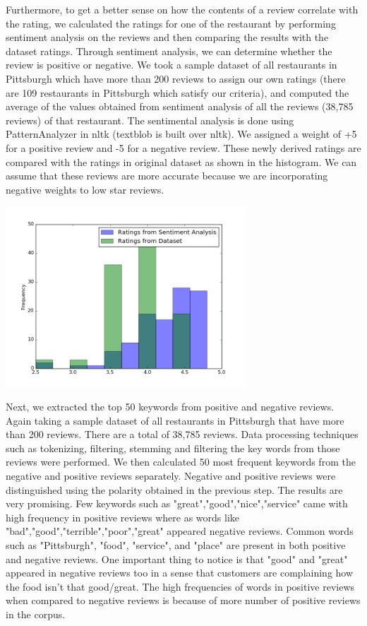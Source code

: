 \documentclass{neu_handout}
\begin{document}
Furthermore, to get a better sense on how the contents of a review correlate with the rating, we calculated the ratings for one of the restaurant by performing sentiment analysis on the reviews and then comparing the results with the dataset ratings. Through sentiment analysis, we can determine whether the review is positive or negative. We took a sample dataset of all restaurants in Pittsburgh which have more than 200 reviews to assign our own ratings (there are 109 restaurants in Pittsburgh which satisfy our criteria), and computed the average of the values obtained from sentiment analysis of all the reviews (38,785 reviews) of that restaurant. The sentimental analysis is done using PatternAnalyzer in nltk (textblob is built over nltk). We assigned a weight of +5 for a positive review and -5 for a negative review. These newly derived ratings are compared with the ratings in original dataset as shown in the histogram. We can assume that these reviews are more accurate because we are incorporating negative weights to low star reviews.

\begin{center}
\includegraphics[width=90mm,scale=0.5]{sentimentanalysis}
\end{center}

Next, we extracted the top 50 keywords from positive and negative reviews. Again taking a sample dataset of all restaurants in Pittsburgh that have more than 200 reviews. There are a total of 38,785 reviews. Data processing techniques such as tokenizing, filtering, stemming and filtering the key words from those reviews were performed. We then calculated 50 most frequent keywords from the negative and positive reviews separately. Negative and positive reviews were distinguished using the polarity obtained in the previous step.
The results are very promising. Few keywords such as "great","good","nice","service" came with high frequency in positive reviews where as words like "bad","good","terrible","poor","great" appeared negative reviews. Common words such as "Pittsburgh", "food", "service", and "place" are present in both positive and negative reviews. One important thing to notice is that "good" and "great" appeared in negative reviews too in a sense that customers are complaining how the food isn't that good/great. The high frequencies of words in positive reviews when compared to negative reviews is because of more number of positive reviews in the corpus.
\end{document}
